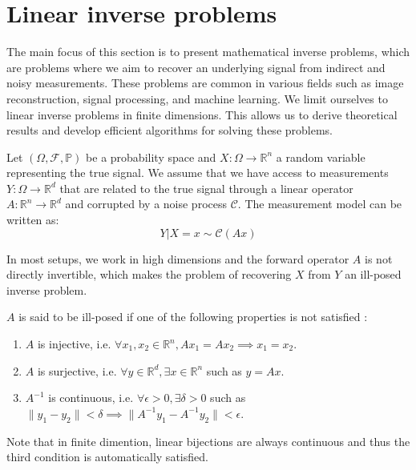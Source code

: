 \section{Linear inverse problems}

The main focus of this section is to present mathematical inverse problems, which are problems where we aim to recover an underlying signal from indirect and noisy measurements. These problems are common in various fields such as image reconstruction, signal processing, and machine learning.
We limit ourselves to linear inverse problems in finite dimensions. This allows us to derive theoretical results and develop efficient algorithms for solving these problems.


Let $(\Omega, \mathcal{F}, \mathbb{P})$ be a probability space and $X: \Omega \to \mathbb{R}^n$ a random variable representing the true signal. We assume that we have access to measurements $Y: \Omega \to \mathbb{R}^d$ that are related to the true signal through a linear operator $A: \mathbb{R}^n \to \mathbb{R}^d$ and corrupted by a noise process $\mathcal{C}$. The measurement model can be written as:
\begin{equation}
    Y | X=x \sim \mathcal{C}(Ax)
    \label{eq:inverse-problem}
\end{equation}

In most setups, we work in high dimensions and the forward operator $A$ is not directly invertible, which makes the problem of recovering $X$ from $Y$ an ill-posed inverse problem.

\begin{definition}
    $A$ is said to be ill-posed if one of the following properties is not satisfied :
\begin{enumerate}
    \item $A$ is injective, i.e. $\forall x_1, x_2 \in \mathbb{R}^n, Ax_1 = Ax_2 \implies x_1 = x_2$.
    \item $A$ is surjective, i.e. $\forall y \in \mathbb{R}^d, \exists x \in \mathbb{R}^n$ such as $y = Ax$.
    \item $A^{-1}$ is continuous, i.e. $\forall \epsilon > 0, \exists \delta > 0$ such as $\| y_1 - y_2 \| < \delta \implies \| A^{-1}y_1 - A^{-1}y_2 \| < \epsilon$.
\end{enumerate}
\end{definition}

\begin{remark}
    Note that in finite dimention, linear bijections are always continuous and thus the third condition is automatically satisfied.
\end{remark}

